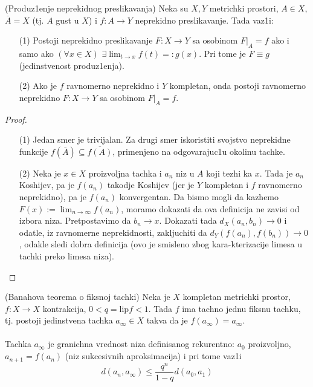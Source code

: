 \documentclass[a4paper,12pt]{article}
\newcommand{\psj}{\subseteq}
\begin{document}
\begin{tma}
(Produz1enje neprekidnog preslikavanja) Neka su $X, Y$ metrichki prostori, $A \in X$, $\overline{A} = X$ (tj. $A$ gust u $X$) i $f: A \to Y$ neprekidno preslikavanje. Tada vaz1i:
\begin{itemize}
\item[(1)] Postoji neprekidno preslikavanje $F: X \to Y$ sa osobinom $F|_{A} = f$ ako i samo ako $(\forall x \in X)$ $\exists \lim_{t \to x} f(t) =: g(x)$. Pri tome je $F \equiv g$ (jedinstvenost produz1enja).
\item[(2)] Ako je $f$ ravnomerno neprekidno i $Y$ kompletan, onda postoji ravnomerno neprekidno $F: X \to Y$ sa osobinom $F|_{A} = f$.
\end{itemize}
\end{tma}
\begin{proof}
\begin{itemize}
	\item[(1)] Jedan smer je trivijalan. Za drugi smer iskoristiti svojstvo neprekidne funkcije $f(\overline{A}) \psj \overline{f(A)}$,
		primenjeno na odgovarajuc1u okolinu tachke.
\item[(2)] Neka je $x\in X$ proizvoljna tachka i $a_n$ niz u $A$ koji tezhi ka $x$. Tada je $a_n$ Koshijev, pa 
	je $f(a_n)$ takodje Koshijev (jer je $Y$ kompletan i $f$ ravnomerno neprekidno), pa je $f(a_n)$ konvergentan.
		Da bismo mogli da kazhemo $F(x):= \lim_{n\to\infty}f(a_n)$, moramo dokazati da ova definicija ne zavisi od izbora
		niza. Pretpostavimo da $b_n\to x$. Dokazati tada $d_X(a_n, b_n)\to 0$ i odatle, iz ravnomerne neprekidnosti, zakljuchiti
		da $d_Y(f(a_n), f(b_n))\to 0$, odakle sledi dobra definicija (ovo je smisleno zbog kara-kterizacije limesa u tachki preko 
		limesa niza).
\end{itemize}

\end{proof}

\begin{tma}
(Banahova teorema o fiksnoj tachki) Neka je $X$ kompletan metrichki prostor, $f: X \to X$ kontrakcija, $0 < q = \mathrm{lip} f < 1$. Tada $f$ ima tachno jednu fiksnu tachku, tj. postoji jedinstvena tachka $a_{\infty} \in X$ takva da je $f(a_{\infty}) = a_{\infty}$.\\ \\
Tachka $a_{\infty}$ je granichna vrednost niza definisanog rekurentno: $a_0$ proizvoljno, $a_{n+1} = f(a_n)$ (niz sukcesivnih aproksimacija) i pri tome vaz1i \[d(a_n, a_{\infty}) \leq \frac{q^n}{1-q} d(a_0, a_1)\]
\end{tma}
\end{document}
